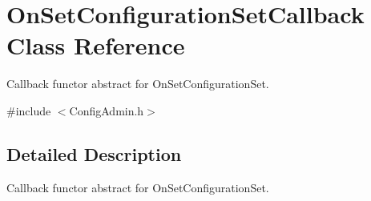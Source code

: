 \section{OnSetConfigurationSetCallback Class Reference}
\label{classOnSetConfigurationSetCallback}


Callback functor abstract for OnSetConfigurationSet.  




{\ttfamily \#include $<$ConfigAdmin.h$>$}



\subsection{Detailed Description}
Callback functor abstract for OnSetConfigurationSet. 